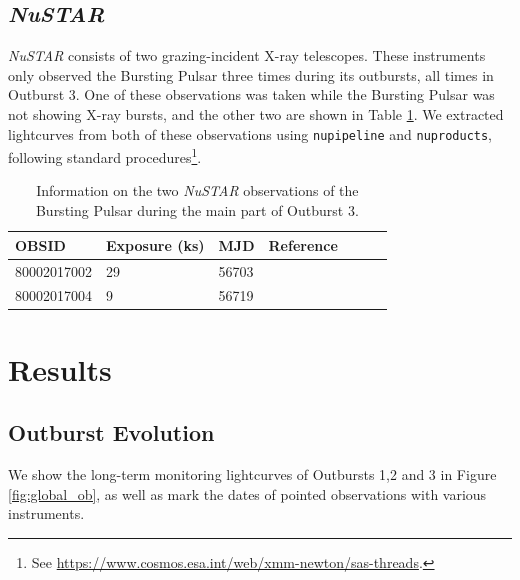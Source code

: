 \subsection{\textit{NuSTAR}}

\par \textit{NuSTAR} \citep{Harrison_NuSTAR} consists of two grazing-incident X-ray telescopes.  These instruments only observed the Bursting Pulsar three times during its outbursts, all times in Outburst 3.  One of these observations was taken while the Bursting Pulsar was not showing X-ray bursts, and the other two are shown in Table \ref{tab:NuS}.  We extracted lightcurves from both of these observations using \texttt{nupipeline} and \texttt{nuproducts}, following standard procedures\footnote{See \url{https://www.cosmos.esa.int/web/xmm-newton/sas-threads}.}.

\begin{table}
\centering
\begin{tabular}{lllllll}
\hline
\hline
\scriptsize  OBSID &\scriptsize Exposure (ks) &\scriptsize MJD &\scriptsize Reference \\
\hline
80002017002 	& 29 & 56703 &  \citet{Dai_Hlags}  \\
80002017004 	& 9 & 56719 & \citet{Younes_Expo}\\
\hline
\hline
\end{tabular}
\caption[Information on two \textit{NuSTAR} observations of the Bursting Pulsar.]{Information on the two \textit{NuSTAR} observations of the Bursting Pulsar during the main part of Outburst 3.}
\label{tab:NuS}
\end{table}

\section{Results}
\label{sec:Results}

\subsection{Outburst Evolution}

\par We show the long-term monitoring lightcurves of Outbursts 1,2 and 3 in Figure \ref{fig:global_ob}, as well as mark the dates of pointed observations with various instruments.

